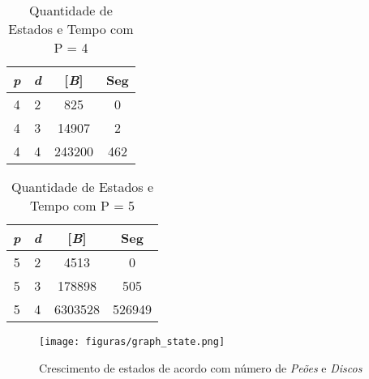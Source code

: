 \begin{table}[ht]
\centering
\begin{tabular}{|c|c|c|c|}
\hline
\emph{p} & \emph{d} & [\emph{B}] & Seg\tabularnewline
\hline
\hline
4 & 2 & 825 & 0\tabularnewline
\hline
4 & 3 & 14907 & 2\tabularnewline
\hline
4 & 4 & 243200 & 462\tabularnewline
\hline
\end{tabular}
\caption{Quantidade de Estados e Tempo com P = 4}
\label{tab:quantidade-de-estados-e-tempo-com-p-4}
\end{table}

\begin{table}[ht]
\centering
\begin{tabular}{|c|c|c|c|}
\hline
\emph{p} & \emph{d} & [\emph{B}] & Seg\tabularnewline
\hline
\hline
5 & 2 & 4513 & 0\tabularnewline
\hline
5 & 3 & 178898 & 505\tabularnewline
\hline
5 & 4 & 6303528 & 526949\tabularnewline
\hline
\end{tabular}
\caption{Quantidade de Estados e Tempo com P = 5}
\label{tab:quantidade-de-estados-e-tempo-com-p-5}
\end{table}

\begin{figure}[ht]
\centering
	\texttt{[image: figuras/graph\_state.png]}
\caption{Crescimento de estados de acordo com número de \emph{Peões} e \emph{Discos}}
\label{fig:crescimento-de-estados-de-acordo-com-numero-de-peoes-e-discos}
\end{figure}

